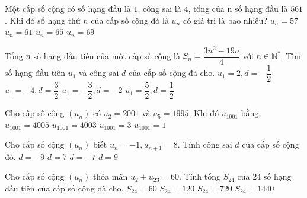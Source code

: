\begin{ex}%
	Một cấp số cộng có số hạng đầu là $1$, công sai là $4$, tổng của n số hạng đầu là $561$. Khi đó số
	hạng thứ $n$ của cấp số cộng đó là $u_n$ có giá trị là bao nhiêu?
	\choice
	{$u_n=57$}
	{$u_n=61$}
	{\True $u_n=65$}
	{$u_n=69$}
\end{ex}
\begin{ex}%
	Tổng $n$ số hạng đầu tiên của một cấp số cộng là $S_n=\dfrac{3n^2-19n}{4}$ với $n\in\mathbb{N}^*$. Tìm số hạng đầu
	tiên $u_1$ và công sai $d$ của cấp số cộng đã cho.
	\choice
	{$u_1=2,d=-\dfrac{1}{2}$}
	{\True $u_1=-4,d=\dfrac{3}{2}$}
	{$u_1=-\dfrac{3}{2},d=-2$}
	{$u_1=\dfrac{5}{2},d=\dfrac{1}{2}$}
\end{ex}
\begin{ex}%
	Cho cấp số cộng $\left(u_n\right)$ có $u_2=2001$ và $u_5=1995$. Khi đó $u_{1001}$ bằng.
	\choice
	{$u_{1001}=4005$}
	{$u_{1001}=4003$}
	{\True $u_{1001}=3$}
	{$u_{1001}=1$}
\end{ex}
\begin{ex}%
	Cho cấp số cộng $\left(u_n\right)$ biết $u_n=-1,u_{n+1}=8$. Tính công sai $d$ của cấp số cộng đó.
	\choice
	{$d=-9$}
	{$d=7$}
	{$d=-7$}
	{\True $d=9$}
\end{ex}
\begin{ex}%
	Cho cấp số cộng $\left(u_n\right)$ thỏa mãn $u_2+u_{23}=60$. Tính tổng $S_24$ của $24$ số hạng đầu tiên của
	cấp số cộng đã cho.
	\choice
	{$S_{24}=60$}
	{$S_{24}=120$}
	{\True $S_{24}=720$}
	{$S_{24}=1440$}
\end{ex}
